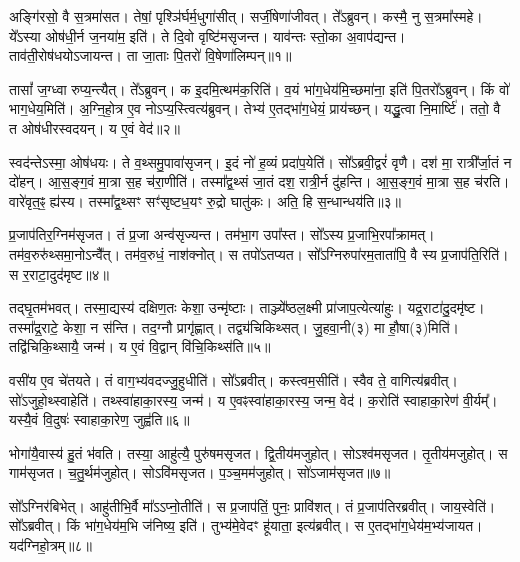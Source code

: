 \setcounter{anuvakam}{0}

अङ्गि॑रसो॒ वै स॒त्रमा॑सत।
तेषां॒ पृश्ञि॑र्घर्म॒धुगा॑सीत्।
सर्जी॒षेणा॑जीवत्।
ते᳚ऽब्रुवन्।
कस्मै॒ नु स॒त्रमा᳚स्महे।
ये᳚ऽस्या ओष॑धी॒र्न ज॒नया॑म॒ इति॑।
ते दि॒वो वृष्टि॑मसृजन्त।
याव॑न्तः स्तो॒का अ॒वाप॑द्यन्त।
ताव॑ती॒रोष॑धयो\-ऽजायन्त।
ता जा॒ताः पि॒तरो॑ वि॒षेणा॑लिम्पन्॥१॥\ip

तासां᳚ ज॒ग्ध्वा रुप्य॒न्त्यैत्।
ते᳚ऽब्रुवन्।
क इ॒दमि॒त्थम॑क॒रिति॑।
व॒यं भा॑ग॒धेय॑मि॒च्छमा॑ना॒ इति॑ पि॒तरो᳚\-ऽब्रुवन्।
किं वो॑ भाग॒धेय॒मिति॑।
अ॒ग्नि॒हो॒त्र ए॒व नोऽप्य॒स्त्वित्य॑ब्रुवन्।
तेभ्य॑ ए॒तद्भा॑ग॒धेयं॒ प्राय॑च्छन्।
यद्धु॒त्वा नि॒मार्ष्टि॑।
ततो॒ वै त ओष॑धीरस्वदयन्।
य ए॒वं वेद॑॥२॥\ip

स्वद॑न्ते\-ऽस्मा॒ ओष॑धयः।
ते व॒थ्समु॒पावा॑सृजन्।
इ॒दं नो॑ ह॒व्यं प्रदा॑प॒येति॑।
सो᳚ऽब्रवी॒द्वरं॑ वृणै।
दश॑ मा॒ रात्री᳚र्जा॒तं न दो॑हन्।
आ॒स॒ङ्ग॒वं मा॒त्रा स॒ह च॑रा॒णीति॑।
तस्मा᳚द्व॒थ्सं जा॒तं दश॒ रात्री॒र्न दु॑हन्ति।
आ॒स॒ङ्ग॒वं मा॒त्रा स॒ह च॑रति।
वारे॑वृत॒ꣴ॒ ह्य॑स्य।
तस्मा᳚द्व॒थ्सꣳ सꣳ॑सृष्टध॒यꣳ रु॒द्रो घातु॑कः।
अति॒ हि स॒न्धान्धय॑ति॥३॥\ip\anuvakamend[अ॒लि॒म्प॒न्वेद॒ घातु॑क॒ एकं॑ च]

प्र॒जा\-प॑तिर॒ग्निम॑\-सृजत।
तं प्र॒जा अन्व॑सृज्यन्त।
तम॑भा॒ग उपा᳚स्त।
सो᳚ऽस्य प्र॒जाभि॒रपा᳚क्रामत्।
तम॑व॒रुरु॑थ्समा॒नो\-ऽन्वै᳚त्।
तम॑व॒रुधं॒ नाश॑क्नोत्।
स तपो॑\-ऽतप्यत।
सो᳚ऽग्निरुपा॑रम॒ताता॑पि॒ वै स्य प्र॒जा\-प॑ति॒रिति॑।
स र॒राटा॒दुद॑मृष्ट॥४॥\ip

तद्\mbox{}घृ॒तम॑भवत्।
तस्मा॒द्यस्य॑ दक्षिण॒तः केशा॒ उन्मृ॑ष्टाः।
ताञ्ज्ये᳚ष्ठल॒क्ष्मी प्रा॑जाप॒त्येत्या॑हुः।
यद्र॒राटा॑दु॒दमृ॑ष्ट।
तस्मा᳚द्र॒राटे॒ केशा॒ न स॑न्ति।
तद॒ग्नौ प्रागृ॑ह्णात्।
तद्व्य॑चिकिथ्सत्।
जु॒हवा॒नी(३) मा हौ॒षा(३)मिति॑।
तद्वि॑चिकि॒थ्सायै॒ जन्म॑।
य ए॒वं वि॒द्वान् वि॑चि॒किथ्स॑ति॥५॥\ip

वसी॑य ए॒व चे॑तयते।
तं वाग॒भ्य॑वदज्जु॒हुधीति॑।
सो᳚ऽब्रवीत्।
कस्त्वम॒सीति॑।
स्वैव ते॒ वागित्य॑ब्रवीत्।
सो॑ऽजुहो॒थ्स्वाहेति॑।
तथ्स्वा॑हाका॒रस्य॒ जन्म॑।
य ए॒वꣴस्वा॑हाका॒रस्य॒ जन्म॒ वेद॑।
क॒रोति॑ स्वाहाका॒रेण॑ वी॒र्यम्᳚।
यस्यै॒वं वि॒दुषः॑ स्वाहाका॒रेण॒ जुह्व॑ति॥६॥\ip

भोगा॑यै॒वास्य॑ हु॒तं भ॑वति।
तस्या॒ आहु॑त्यै॒ पुरु॑षम\-सृजत।
द्वि॒तीय॑मजुहोत्।
सोऽश्व॑म\-सृजत।
तृ॒तीय॑मजुहोत्।
स गाम॑\-सृजत।
च॒तु॒र्थम॑जुहोत्।
सोऽवि॑म\-सृजत।
प॒ञ्च॒मम॑जुहोत्।
सो॑ऽजाम॑\-सृजत॥७॥\ip

सो᳚ऽग्निर॑बिभेत्।
आहु॑तीभि॒र्वै मा᳚\-ऽऽप्नो॒तीति॑।
स प्र॒जा\-प॑तिं॒ पुनः॒ प्रावि॑शत्।
तं प्र॒जा\-प॑तिरब्रवीत्।
जाय॒स्वेति॑।
सो᳚ऽब्रवीत्।
किं भा॑ग॒धेय॑म॒भि ज॑निष्य॒ इति॑।
तुभ्य॑मे॒वेदꣳ हू॑याता॒ इत्य॑ब्रवीत्।
स ए॒तद्भा॑ग॒धेय॑म॒भ्य॑जायत।
यद॑ग्निहो॒त्रम्॥८॥\ip

